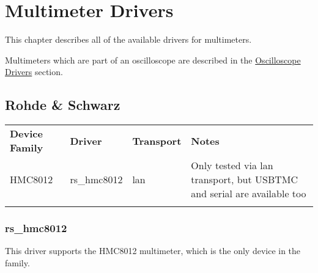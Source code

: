 \chapter{Multimeter Drivers}
\label{sec:meter-drivers}

This chapter describes all of the available drivers for multimeters.

Multimeters which are part of an oscilloscope are described in the \hyperref[sec:scope-drivers]{Oscilloscope
Drivers} section.

\section{Rohde \& Schwarz}

\begin{tabularx}{16cm}{lllX}
\thickhline
\textbf{Device Family} & \textbf{Driver} & \textbf{Transport} & \textbf{Notes} \\
\thickhline
HMC8012 & rs\_hmc8012 & lan & Only tested via lan transport, but USBTMC and serial are available too\\
\thickhline
\end{tabularx}

\subsection{rs\_hmc8012}

This driver supports the HMC8012 multimeter, which is the only device in the family.
